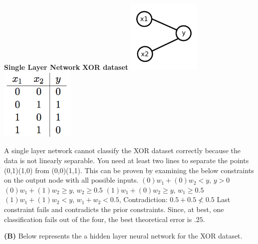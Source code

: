 \documentclass[12pt,twoside]{article}
\newcommand{\tabUnit}{3ex}
\newcommand{\tabT}{\hspace*{\tabUnit}}
\begin{document}
\begin{center}
\tabT\tabT\tabT\textbf{Single Layer Network}
\tabT\tabT\tabT \textbf{XOR dataset}
\newline
{}
\includegraphics[width = 100pt]{XOR_singleL}
\tabT\tabT\tabT
\includegraphics[width = 100pt]{XOR_logical}
\end{center}

\tabT A single layer network cannot classify the XOR dataset correctly because the data is not linearly separable.  You need at least two lines to separate the points (0,1)(1,0) from (0,0)(1,1).  This can be proven by examining the below constraints on the output node with all possible inputs.
\newline
\newline
$(0)w_{1} + (0)w_{2} < y$, \tabT\tabT $y > 0$ \newline
$(0)w_{1} + (1)w_{2} \geq y$, \tabT\tabT $w_{2} \geq 0.5$ \newline
$(1)w_{1} + (0)w_{2} \geq y$, \tabT\tabT $w_{1} \geq 0.5$ \newline
$(1)w_{1} + (1)w_{2} < y$, \tabT\tabT $w_{1} + w_{2} < 0.5$, \tabT\tabT
Contradiction: $0.5 + 0.5 \nless 0.5$ 
\newline
\newline
Last constraint fails and contradicts the prior constraints.  Since, at best, one classification fails out of the four, the best theoretical error is $.25$.
\newline

\textbf{(B)} Below represents the a hidden layer neural network for the XOR dataset.
\newline
\end{document}

